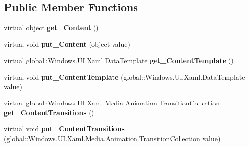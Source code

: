 \subsection*{Public Member Functions}
\begin{DoxyCompactItemize}
\item 
\mbox{\label{class_windows_1_1_u_i_1_1_xaml_1_1_controls_1_1_content_presenter_ace25dbfb4a1344628f258b49b6684b60}} 
virtual object {\bfseries get\+\_\+\+Content} ()
\item 
\mbox{\label{class_windows_1_1_u_i_1_1_xaml_1_1_controls_1_1_content_presenter_a3810290b145067dd2f414f610fac22f6}} 
virtual void {\bfseries put\+\_\+\+Content} (object value)
\item 
\mbox{\label{class_windows_1_1_u_i_1_1_xaml_1_1_controls_1_1_content_presenter_a030cf13f51de73d513e0eb6d3bd1a244}} 
virtual global\+::\+Windows.\+U\+I.\+Xaml.\+Data\+Template {\bfseries get\+\_\+\+Content\+Template} ()
\item 
\mbox{\label{class_windows_1_1_u_i_1_1_xaml_1_1_controls_1_1_content_presenter_a04897e69fee95e8cef678c4d33d68cc1}} 
virtual void {\bfseries put\+\_\+\+Content\+Template} (global\+::\+Windows.\+U\+I.\+Xaml.\+Data\+Template value)
\item 
\mbox{\label{class_windows_1_1_u_i_1_1_xaml_1_1_controls_1_1_content_presenter_a7c18cd7aea309583f3316d93b3806aff}} 
virtual global\+::\+Windows.\+U\+I.\+Xaml.\+Media.\+Animation.\+Transition\+Collection {\bfseries get\+\_\+\+Content\+Transitions} ()
\item 
\mbox{\label{class_windows_1_1_u_i_1_1_xaml_1_1_controls_1_1_content_presenter_a6c2f730bfeb5bf81e86705be31b97742}} 
virtual void {\bfseries put\+\_\+\+Content\+Transitions} (global\+::\+Windows.\+U\+I.\+Xaml.\+Media.\+Animation.\+Transition\+Collection value)
\item 
\mbox{\label{class_windows_1_1_u_i_1_1_xaml_1_1_controls_1_1_content_presenter_ae3da9c59b5e71dc152d5473039d18ef7}} 

\end{DoxyCompactItemize}
